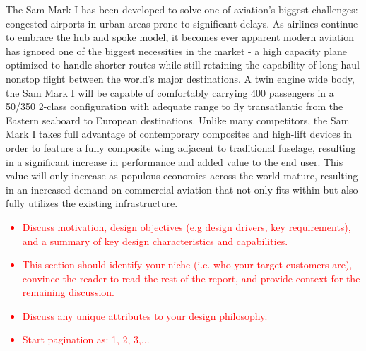 The Sam Mark I has been developed to solve one of aviation's biggest challenges: congested airports in urban areas prone to significant delays.  As airlines continue to embrace the hub and spoke model, it becomes ever apparent modern aviation has ignored one of the biggest necessities in the market - a high capacity plane optimized to handle shorter routes while still retaining the capability of long-haul nonstop flight between the world's major destinations. A twin engine wide body, the Sam Mark I will be capable of comfortably carrying 400 passengers in a 50/350 2-class configuration with adequate range to fly transatlantic from the Eastern seaboard to European destinations.  Unlike many competitors, the Sam Mark I takes full advantage of contemporary composites and high-lift devices in order to feature a fully composite wing adjacent to traditional fuselage, resulting in a significant increase in performance and added value to the end user.  This value will only increase as populous economies across the world mature, resulting in an increased demand on commercial aviation that not only fits within but also fully utilizes the existing infrastructure. 
\textcolor{red}{
\begin{itemize}
    \item Discuss motivation, design objectives (e.g design drivers, key requirements), and a summary of key design characteristics and capabilities. 
    \item This section should identify your niche (i.e. who your target customers are), convince the reader to read the rest of the report, and provide context for the remaining discussion. 
    \item Discuss any unique attributes to your design philosophy. 
    \item Start pagination as: 1, 2, 3,... \checkmark
\end{itemize}}